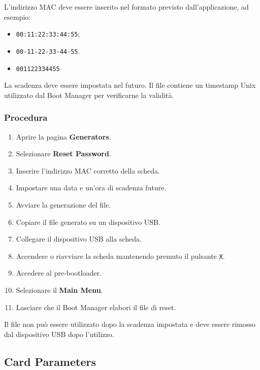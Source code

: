 \documentclass[11pt,a4paper]{article}
\newcommand{\button}[1]{\textbf{#1}}
\begin{document}
L'indirizzo MAC deve essere inserito nel formato previsto
dall'applicazione, ad esempio:

\begin{itemize}
    \item \texttt{00:11:22:33:44:55};
    \item \texttt{00-11-22-33-44-55}.
    \item \texttt{001122334455}
\end{itemize}

La scadenza deve essere impostata nel futuro. Il file contiene
un timestamp Unix utilizzato dal Boot Manager per verificarne
la validità.

\subsubsection*{Procedura}

\begin{enumerate}
    \item Aprire la pagina \button{Generators}.
    \item Selezionare \button{Reset Password}.
    \item Inserire l'indirizzo MAC corretto della scheda.
    \item Impostare una data e un'ora di scadenza future.
    \item Avviare la generazione del file.
    \item Copiare il file generato su un dispositivo USB.
    \item Collegare il dispositivo USB alla scheda.
    \item Accendere o riavviare la scheda mantenendo premuto
    il pulsante \texttt{X}.
    \item Accedere al pre-bootloader.
    \item Selezionare il \textbf{Main Menu}.
    \item Lasciare che il Boot Manager elabori il file di reset.
\end{enumerate}

Il file non può essere utilizzato dopo la scadenza impostata
e deve essere rimosso dal dispositivo USB dopo l'utilizzo.

\subsection{Card Parameters}
\end{document}
